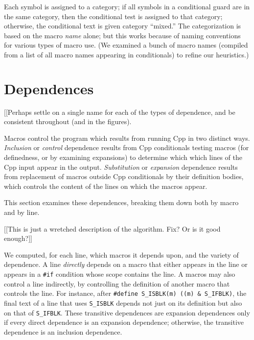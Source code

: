 \documentclass[10pt]{article}
\begin{document}
      Each symbol is assigned to a category; if all symbols in a
      conditional guard are in the same category, then the conditional test
      is assigned to that category; otherwise, the conditional text is
      given category ``mixed.''  The categorization is based on the macro
      {\em name} alone; but this works because of naming conventions for
      various types of macro use.  (We examined a bunch of macro names
      (compiled from a list of all macro names appearing in conditionals)
      to refine our heuristics.)


{}


\section{Dependences}
\label{sec:dependence}
\label{sec:last-content-section}

[[Perhaps settle on a single name for each of the types of dependence, and
be consistent throughout (and in the figures).

Macros control the program which results from running Cpp in two distinct
ways.  {\em Inclusion} or {\em control} dependence results from Cpp
conditionals testing macros (for definedness, or by examining expansions)
to determine which which lines of the Cpp input appear in the output.  {\em
Substitution} or {\em expansion} dependence results from replacement of
macros outside Cpp conditionals by their definition bodies, which controls
the content of the lines on which the macros appear.

This section examines these dependences, breaking them down both by macro
and by line.





[[This is just a wretched description of the algorithm.  Fix?  Or is it
good enough?]]

We computed, for each line, which macros it depends upon, and the variety
of dependence.  A line {\em directly} depends on a macro that either
appears in the line or appears in a {\tt \#if} condition whose scope
contains the line.  A macros may also control a line indirectly, by
controlling the definition of another macro that controls the line.  For
instance, after {\tt \#define \verb|S_ISBLK|(m) ((m) \& \verb|S_IFBLK|)},
the final text of a line that uses \verb|S_ISBLK| depends not just on its
definition but also on that of \verb|S_IFBLK|.  These transitive
dependences are expansion dependences only if every direct dependence is an
expansion dependence; otherwise, the transitive dependence is an inclusion
dependence.
\end{document}
